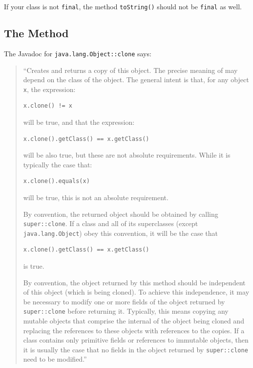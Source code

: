 If your class is not \lstinline|final|, the method \lstinline|toString()| should not be \lstinline|final| as well. 


\subsection{The Method }\label{sec:Clone}
The Javadoc for \lstinline|java.lang.Object::clone| \autocite{ORACLE_DOC_OBJECT:clone} says:

\begin{quote}
``Creates and returns a copy of this object. The precise meaning of  may depend on the class of the object. The general intent is that, for any object \lstinline|x|, the expression:
\begin{lstlisting}
x.clone() != x
\end{lstlisting}

will be true, and that the expression:
\begin{lstlisting}
x.clone().getClass() == x.getClass()
\end{lstlisting}

will be also true, but these are not absolute requirements. While it is typically the case that:
\begin{lstlisting}
x.clone().equals(x)
\end{lstlisting}
will be true, this is not an absolute requirement.

By convention, the returned object should be obtained by calling \lstinline|super::clone|. If a class and all of its superclasses (except \lstinline|java.lang.Object|) obey this convention, it will be the case that 
\begin{lstlisting}
x.clone().getClass() == x.getClass()
\end{lstlisting}

is true.

By convention, the object returned by this method should be independent of this object (which is being cloned). To achieve this independence, it may be necessary to modify one or more fields of the object returned by \lstinline|super::clone| before returning it. Typically, this means copying any mutable objects that comprise the internal  of the object being cloned and replacing the references to these objects with references to the copies. If a class contains only primitive fields or references to immutable objects, then it is usually the case that no fields in the object returned by \lstinline|super::clone| need to be modified.''
\end{quote}

